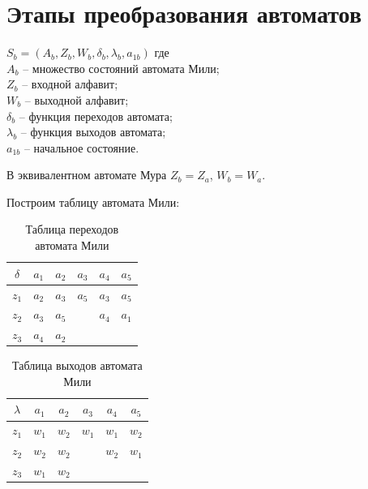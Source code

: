 \section{Этапы преобразования автоматов}
        $S_b = (A_b, Z_b, W_b, {\delta}_b, {\lambda}_b, a_{1b})$
        где \\
        $A_b$ -- множество состояний автомата Мили; \\
        $Z_b$ -- входной алфавит; \\
        $W_b$ -- выходной алфавит; \\
        ${\delta}_b$ -- функция переходов автомата; \\
        ${\lambda}_b$ -- функция выходов автомата; \\
        $a_{1b}$ -- начальное состояние.

        В эквивалентном автомате Мура $Z_b = Z_a$, $W_b = W_a$.

        Построим таблицу автомата Мили:

        \begin{table}[!h]
        \centering
            \begin{tabular} {|c|c|c|c|c|c|}
                \hline
                $\delta$ & $a_1$ & $a_2$ & $a_3$ & $a_4$ & $a_5$ \\ \hline
                $z_1$  & $a_2$ & $a_3$ & $a_5$ & $a_3$ & $a_5$ \\ \hline
                $z_2$  & $a_3$ & $a_5$ &       & $a_4$ & $a_1$ \\ \hline
                $z_3$  & $a_4$ & $a_2$ &       &       &       \\ \hline
            \end{tabular}
            \caption{Таблица переходов автомата Мили}
        \end{table}
        \begin{table}[!h]
        \centering
            \begin{tabular} {|c|c|c|c|c|c|}
                \hline
                $\lambda$ & $a_1$ & $a_2$ & $a_3$ & $a_4$ & $a_5$ \\ \hline
                $z_1$  & $w_1$ & $w_2$ & $w_1$ & $w_1$ & $w_2$ \\ \hline
                $z_2$  & $w_2$ & $w_2$ &       & $w_2$ & $w_1$ \\ \hline
                $z_3$  & $w_1$ & $w_2$ &       &       &       \\ \hline
            \end{tabular}
            \caption{Таблица выходов автомата Мили}
        \end{table}

